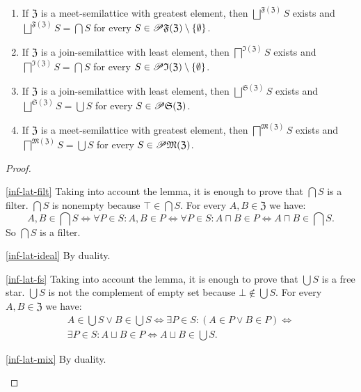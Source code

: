 \begin{thm}
~
\begin{enumerate}
\item \label{inf-lat-filt}If $\mathfrak{Z}$ is a meet-semilattice with
greatest element, then $\bigsqcup^{\mathfrak{F}(\mathfrak{Z})}S$
exists and $\bigsqcup^{\mathfrak{F}(\mathfrak{Z})}S=\bigcap S$ for
every $S\in\mathscr{P}\mathfrak{F}(\mathfrak{Z})\setminus\{\emptyset\}$.
\item \label{inf-lat-ideal}If $\mathfrak{Z}$ is a join-semilattice with
least element, then $\bigsqcap^{\mathfrak{I}(\mathfrak{Z})}S$ exists
and $\bigsqcap^{\mathfrak{I}(\mathfrak{Z})}S=\bigcap S$ for every
$S\in\mathscr{P}\mathfrak{I}(\mathfrak{Z})\setminus\{\emptyset\}$.
\item \label{inf-lat-fs}If $\mathfrak{Z}$ is a join-semilattice with least
element, then $\bigsqcup^{\mathfrak{S}(\mathfrak{Z})}S$ exists and
$\bigsqcup^{\mathfrak{S}(\mathfrak{Z})}S=\bigcup S$ for every $S\in\mathscr{P}\mathfrak{S}(\mathfrak{Z})$.
\item \label{inf-lat-mix}If $\mathfrak{Z}$ is a meet-semilattice with
greatest element, then $\bigsqcap^{\mathfrak{M}(\mathfrak{Z})}S$
exists and $\bigsqcap^{\mathfrak{M}(\mathfrak{Z})}S=\bigcup S$ for
every $S\in\mathscr{P}\mathfrak{M}(\mathfrak{Z})$.
\end{enumerate}
\end{thm}
\begin{proof}
~
\begin{widedisorder}
\item [{\ref{inf-lat-filt}}] Taking into account the lemma, it is enough
to prove that $\bigcap S$ is a filter. $\bigcap S$ is nonempty because
$\top\in\bigcap S$. For every $A,B\in\mathfrak{Z}$ we have:
\[
A,B\in\bigcap S\Leftrightarrow\forall P\in S:A,B\in P\Leftrightarrow\forall P\in S:A\sqcap B\in P\Leftrightarrow A\sqcap B\in\bigcap S.
\]
So $\bigcap S$ is a filter.
\item [{\ref{inf-lat-ideal}}] By duality.
\item [{\ref{inf-lat-fs}}] Taking into account the lemma, it is enough
to prove that $\bigcup S$ is a free star. $\bigcup S$ is not the
complement of empty set because $\bot\notin\bigcup S$. For every
$A,B\in\mathfrak{Z}$ we have:
\begin{multline*}
A\in\bigcup S\lor B\in\bigcup S\Leftrightarrow\exists P\in S:(A\in P\lor B\in P)\Leftrightarrow\\
\exists P\in S:A\sqcup B\in P\Leftrightarrow A\sqcup B\in\bigcup S.
\end{multline*}

\item [{\ref{inf-lat-mix}}] By duality.
\end{widedisorder}
\end{proof}
